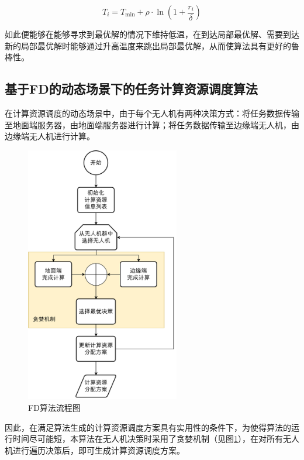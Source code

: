 \begin{equation}
    T_i = T_{\min} + \rho \cdot \ln (1 + \frac{r_i}{\delta})
    \nonumber
\end{equation}

如此便能够在能够寻求到最优解的情况下维持低温，在到达局部最优解、需要到达新的局部最优解时能够通过升高温度来跳出局部最优解，从而使算法具有更好的鲁棒性。

\subsection{基于FD的动态场景下的任务计算资源调度算法}

在计算资源调度的动态场景中，由于每个无人机有两种决策方式：将任务数据传输至地面端服务器，由地面端服务器进行计算；将任务数据传输至边缘端无人机，由边缘端无人机进行计算。

\begin{figure}[!htbp]
    \centering
    \includegraphics[width=0.6\textwidth]{./images/fd.pdf}
    \caption{FD算法流程图}
    \label{fig:FD算法流程图}
\end{figure}


因此，在满足算法生成的计算资源调度方案具有实用性的条件下，为使得算法的运行时间尽可能短，本算法在无人机决策时采用了贪婪机制（见图\ref{fig:FD算法流程图}），在对所有无人机进行遍历决策后，即可生成计算资源调度方案。

